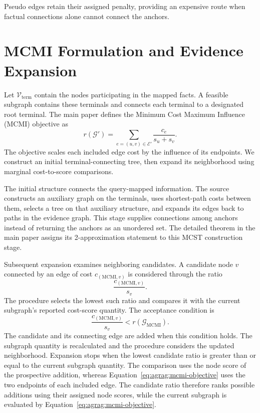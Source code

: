Pseudo edges retain their assigned penalty, providing an expensive route when factual connections alone cannot connect the anchors.

\section{MCMI Formulation and Evidence Expansion}
\label{sec:agrag:mcmi}
Let $\mathcal{V}_{\mathrm{term}}$ contain the nodes participating in the mapped facts. A feasible subgraph contains these terminals and connects each terminal to a designated root terminal. The main paper defines the Minimum Cost Maximum Influence (MCMI) objective as
\begin{equation}
r(\mathcal{G}')=\sum_{e=(u,v)\in\mathcal{E}'}
\frac{c_e}{s_u+s_v}.
\label{eq:agrag:mcmi-objective}
\end{equation}
The objective scales each included edge cost by the influence of its endpoints. We construct an initial terminal-connecting tree, then expand its neighborhood using marginal cost-to-score comparisons.

The initial structure connects the query-mapped information. The source constructs an auxiliary graph on the terminals, uses shortest-path costs between them, selects a tree on that auxiliary structure, and expands its edges back to paths in the evidence graph. This stage supplies connections among anchors instead of returning the anchors as an unordered set. The detailed theorem in the main paper assigns its 2-approximation statement to this MCST construction stage.

Subsequent expansion examines neighboring candidates. A candidate node $v$ connected by an edge of cost $c_{(\mathrm{MCMI},v)}$ is considered through the ratio
\begin{equation}
\frac{c_{(\mathrm{MCMI},v)}}{s_v}.
\label{eq:agrag:marginal}
\end{equation}
The procedure selects the lowest such ratio and compares it with the current subgraph's reported cost-score quantity. The acceptance condition is
\begin{equation}
\frac{c_{(\mathrm{MCMI},v)}}{s_v}<r(\mathcal{G}_{\mathrm{MCMI}}).
\label{eq:agrag:acceptance}
\end{equation}
The candidate and its connecting edge are added when this condition holds. The subgraph quantity is recalculated and the procedure considers the updated neighborhood. Expansion stops when the lowest candidate ratio is greater than or equal to the current subgraph quantity. The comparison uses the node score of the prospective addition, whereas Equation~\ref{eq:agrag:mcmi-objective} uses the two endpoints of each included edge. The candidate ratio therefore ranks possible additions using their assigned node scores, while the current subgraph is evaluated by Equation~\ref{eq:agrag:mcmi-objective}.

